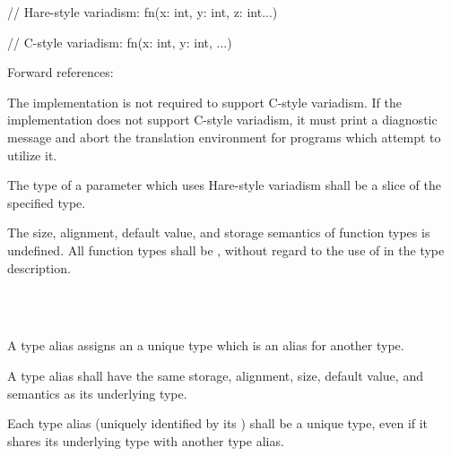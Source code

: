 \begin{codesample}
// Hare-style variadism:
fn(x: int, y: int, z: int...)

// C-style variadism:
fn(x: int, y: int, ...)
\end{codesample}

Forward references: 

\specsubsubitem
The implementation is not required to support C-style variadism. If the
implementation does not support C-style variadism, it must print a diagnostic
message and abort the translation environment for programs which attempt to
utilize it.

\specsubsubitem
The type of a parameter which uses Hare-style variadism shall be a
 slice of the specified type.


\specsubsubitem
The size, alignment, default value, and storage semantics of function types is
undefined. All function types shall be , without regard to the
use of  in the type description.


\begin{grammar}
 \\
	 \\
\end{grammar}

\specsubsubitem
A type alias assigns an  a unique type which is an
alias for another type.


\specsubsubitem
A type alias shall have the same storage, alignment, size, default value, and
semantics as its underlying type.

\specsubsubitem
Each type alias (uniquely identified by its ) shall be
a unique type, even if it shares its underlying type with another type alias.

